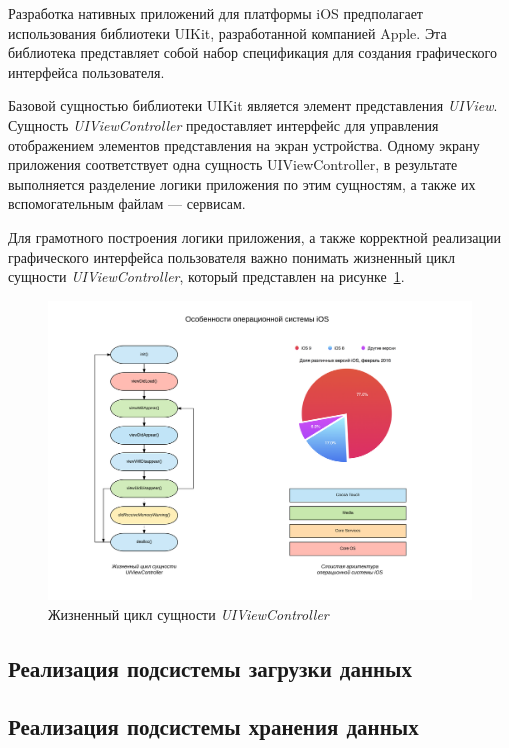 Разработка нативных приложений для платформы iOS предполагает использования
библиотеки UIKit, разработанной компанией Apple. Эта библиотека представляет
собой набор спецификация для создания графического интерфейса пользователя.

\pagebreak

Базовой сущностью библиотеки UIKit является элемент представления \textit{UIView}.
Сущность \textit{UIViewController} предоставляет интерфейс для управления отображением
элементов представления на экран устройства. Одному экрану приложения соответствует
одна сущность UIViewController, в результате выполняется разделение
логики приложения по этим сущностям, а также их вспомогательным файлам --- сервисам.

Для грамотного построения логики приложения, а также корректной реализации графического
интерфейса пользователя важно понимать жизненный цикл сущности \textit{UIViewController},
который представлен на рисунке~\ref{fig:vc_lifecycle}.
\begin{figure}[h!]
  \centering
  \includegraphics[width=130mm]{fig/vc_lifecycle}
  \caption{Жизненный цикл сущности \textit{UIViewController}}
  \label{fig:vc_lifecycle}
\end{figure}



\subsection{Реализация подсистемы загрузки данных}
\pagebreak


\subsection{Реализация подсистемы хранения данных}
\pagebreak


